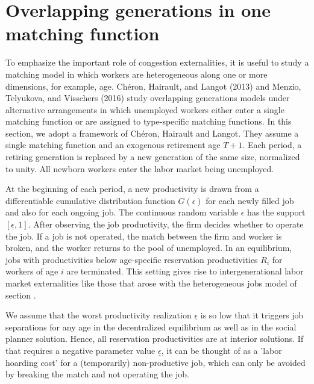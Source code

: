   
\section{Overlapping generations in one matching function}\label{sec:M_OLG1}%
  To emphasize the important role of  congestion externalities, it
  is useful to study a matching model in which workers are heterogeneous along one or more
  dimensions, for example, age.
 Ch\'eron,
Hairault, and Langot (2013) and Menzio, Telyukova, and Visschers (2016)
study overlapping generations  models under alternative arrangements in which unemployed
workers either enter a single matching function or are assigned to type-specific
matching functions. In this section,
we adopt a framework of Ch\'eron, Hairault
and Langot. They  assume a single matching function and an exogenous retirement
age $T+1$. Each period, a retiring generation is replaced by a new generation of the same
size, normalized to unity.  All newborn workers enter the labor market being
unemployed.


At the beginning of each period, a new
productivity is drawn  from a differentiable
cumulative distribution function $G(\epsilon)$
for each newly filled job and also  for each ongoing job.
The continuous random variable $\epsilon$ has the support
$[\underline \epsilon,1]$.
After observing the job
productivity, the firm decides whether  to operate the job. If a job
is not operated, the match between the firm and worker is broken, and the
worker returns to the pool of unemployed. In an equilibrium, jobs with  productivities below
age-specific reservation productivities $R_i$ for  workers of
age $i$ are terminated. This setting gives rise to
intergenerational labor market externalities   like  those that
arose with the  heterogeneous jobs model of  section .

We assume that the worst productivity realization $\underline \epsilon$
is so low that it triggers job separations for any age in the
decentralized equilibrium as well as in the social planner solution.
Hence, all reservation productivities are at interior solutions.
If that requires a negative parameter value $\underline \epsilon$, it
can be thought of as a 'labor hoarding cost' for a (temporarily)
non-productive job, which can only be avoided by breaking the match
and not operating the job.



